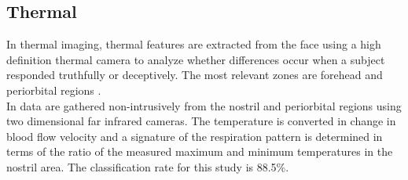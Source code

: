 \documentclass[LaM,binding=0.6cm,english,noexaminfo]{sapthesis}
\begin{document}
\subsection*{Thermal}
In thermal imaging, thermal features are extracted from the face using a high definition thermal camera to analyze whether differences occur when a subject responded truthfully or deceptively. The most relevant zones are forehead and periorbital regions \cite{Rajoub} \cite{Abouelenien:2015:TAD:2823465.2823470}. \\
In \cite{6967765} data are gathered non-intrusively from the nostril and periorbital regions using two dimensional far infrared cameras. The temperature is converted in change in blood flow velocity and a signature of the respiration pattern is determined in terms of the ratio of the measured maximum and minimum temperatures in the nostril area. The classification rate for this study is 88.5\%.
\end{document}

